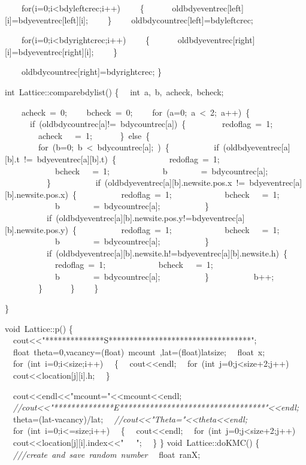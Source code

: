 {\ \ \ \ for(i=0;i<{}bdyleftcrec;i++)
\ \ \ \ \{
\ \ \ \ \ \ oldbdyeventrec[left][i]=bdyeventrec[left][i];
\ \ \ \ \}
\ \ \ \ oldbdycountrec[left]=bdyleftcrec;


\ \ \ \ for(i=0;i<{}bdyrightcrec;i++)
\ \ \ \ \{
\ \ \ \ \ \ oldbdyeventrec[right][i]=bdyeventrec[right][i];
\ \ \ \ \}

\ \ \ \ oldbdycountrec[right]=bdyrightcrec;
\}

int\ Lattice::comparebdylist()
\{
\ \ int\ a,\ b,\ acheck,\ bcheck;

\ \ \ \ acheck\ =\ 0;
\ \ \ \ bcheck\ =\ 0;
\ \ \ \ for\ (a=0;\ a\ <{}\ 2;\ a++)\ \{
\ \ \ \ \ \ if\ (oldbdycountrec[a]!=\ bdycountrec[a])\ \{
\ \ \ \ \ \ \ \ redoflag\ =\ 1;
\ \ \ \ \ \ \ \ acheck\ \ \ =\ 1;
\ \ \ \ \ \ \}\ else\ \{
\ \ \ \ \ \ \ \ for\ (b=0;\ b\ <{}\ bdycountrec[a];\ )\ \{
\ \ \ \ \ \ \ \ \ \ if\ (oldbdyeventrec[a][b].t\ !=\ bdyeventrec[a][b].t)\ \{
\ \ \ \ \ \ \ \ \ \ \ \ redoflag\ =\ 1;
\ \ \ \ \ \ \ \ \ \ \ \ bcheck\ \ \ =\ 1;
\ \ \ \ \ \ \ \ \ \ \ \ b\ \ \ \ \ \ \ \ =\ bdycountrec[a];
\ \ \ \ \ \ \ \ \ \ \}
\ \ \ \ \ \ \ \ \ \ if\ (oldbdyeventrec[a][b].newsite.pos.x\ !=\ bdyeventrec[a][b].newsite.pos.x)\ \{
\ \ \ \ \ \ \ \ \ \ redoflag\ =\ 1;
\ \ \ \ \ \ \ \ \ \ \ \ bcheck\ \ \ =\ 1;
\ \ \ \ \ \ \ \ \ \ \ \ b\ \ \ \ \ \ \ \ =\ bdycountrec[a];
\ \ \ \ \ \ \ \ \ \ \}
\ \ \ \ \ \ \ \ \ \ if\ (oldbdyeventrec[a][b].newsite.pos.y!=bdyeventrec[a][b].newsite.pos.y)\ \{
\ \ \ \ \ \ \ \ \ \ redoflag\ =\ 1;
\ \ \ \ \ \ \ \ \ \ \ \ bcheck\ \ \ =\ 1;
\ \ \ \ \ \ \ \ \ \ \ \ b\ \ \ \ \ \ \ \ =\ bdycountrec[a];
\ \ \ \ \ \ \ \ \ \ \}
\ \ \ \ \ \ \ \ \ \ if\ (oldbdyeventrec[a][b].newsite.h!=bdyeventrec[a][b].newsite.h)\ \{
\ \ \ \ \ \ \ \ \ \ \ \ redoflag\ =\ 1;
\ \ \ \ \ \ \ \ \ \ \ \ bcheck\ \ \ =\ 1;
\ \ \ \ \ \ \ \ \ \ \ \ b\ \ \ \ \ \ \ \ =\ bdycountrec[a];
\ \ \ \ \ \ \ \ \ \ \}
\ \ \ \ \ \ \ \ \ \ b++;
\ \ \ \ \ \ \ \ \}
\ \ \ \ \ \ \}
\ \ \ \ \}

\}


void\ Lattice::p()
\{
\ \ cout<{}<{}"{}**************S**********************************"{};
\ \ float\ theta=0,vacancy=(float)\ mcount\ ,lat=(float)latsize;
\ \ float\ x;
\ \ for\ (int\ i=0;i<{}size;i++)
\ \ \{
\ \ cout<{}<{}endl;
\ \ for\ (int\ j=0;j<{}size+2;j++)
\ \ cout<{}<{}location[j][i].h;
\ \ \}

\ \ cout<{}<{}endl<{}<{}"{}mcount="{}<{}<{}mcount<{}<{}endl;
\ \ \textsl{//cout<{}<{}"{}**************E**********************************"{}<{}<{}endl;}
\ \ theta=(lat-{}vacancy)/lat;
\ \ \textsl{//cout<{}<{}"{}Theta="{}<{}<{}theta<{}<{}endl;}
\ \ for\ (int\ i=0;i<{}=size;i++)
\ \ \{
\ \ cout<{}<{}endl;
\ \ for\ (int\ j=0;j<{}size+2;j++)
\ \ cout<{}<{}location[j][i].index<{}<{}"{}\ \ \ "{};
\ \ \}
\}
void\ Lattice::doKMC()
\{
\ \ \textsl{///create\ and\ save\ random\ number}
\ \ float\ ranX;

}
